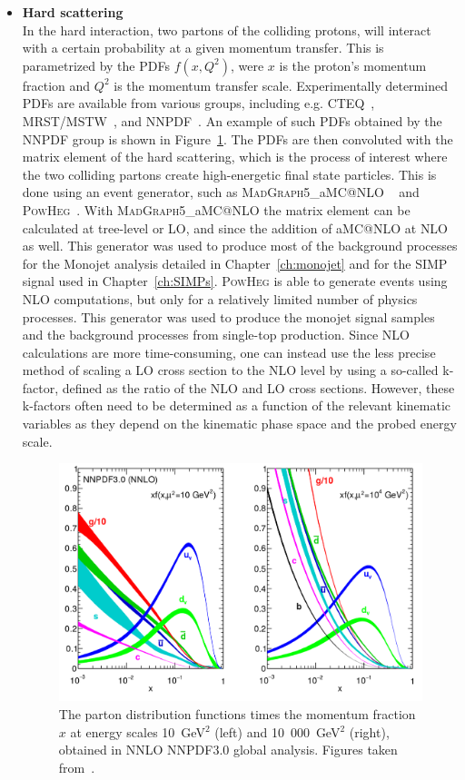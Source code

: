 \begin{itemize}
 \item[] \textbf{Hard scattering}\\
 In the hard interaction, two partons of the colliding protons, will interact with a certain probability at a given momentum transfer. This is parametrized by the \acp{PDF} $f(x, Q^2)$, were $x$ is the proton's momentum fraction and $Q^2$ is the momentum transfer scale. Experimentally determined \acp{PDF} are available from various groups, including e.g. CTEQ~\cite{Pumplin:2002vw}, MRST/MSTW~\cite{Martin:2009iq}, and NNPDF~\cite{Ball:2014uwa}. An example of such \acp{PDF} obtained by the NNPDF group is shown in Figure~\ref{fig:pdf}. The \acp{PDF} are then convoluted with the matrix element of the hard scattering, which is the process of interest where the two colliding partons create high-energetic final state particles. This is done using an event generator, such as \textsc{MadGraph5\_}a\textsc{MC@NLO} ~\cite{Alwall:2014hca} and \textsc{PowHeg}~\cite{Frixione:2007vw}. With \textsc{MadGraph5\_}a\textsc{MC@NLO} the matrix element can be calculated at tree-level or \ac{LO}, and since the addition of a\textsc{MC@NLO} at \ac{NLO} as well. This generator was used to produce most of the background processes for the Monojet analysis detailed in Chapter~\ref{ch:monojet} and for the \ac{SIMP} signal used in Chapter~\ref{ch:SIMPs}. \textsc{PowHeg} is able to generate events using \ac{NLO} computations, but only for a relatively limited number of physics processes. This generator was used to produce the monojet signal samples and the background processes from single-top production. Since \ac{NLO} calculations are more time-consuming, one can instead use the less precise method of scaling a \ac{LO} cross section to the \ac{NLO} level by using a so-called k-factor, defined as the ratio of the \ac{NLO} and \ac{LO} cross sections. However, these k-factors often need to be determined as a function of the relevant kinematic variables as they depend on the kinematic phase space and the probed energy scale.

\begin{figure}[ht]
  \centering
 \includegraphics[width=.75\textwidth]{pdf.png} 
 \caption{The parton distribution functions times the momentum fraction $x$ at energy scales 10~GeV$^2$ (left) and 10~000~GeV$^2$ (right), obtained in NNLO NNPDF3.0 global analysis. Figures taken from~\cite{Ball:2014uwa}.}
 \label{fig:pdf}
\end{figure}


\end{itemize}
